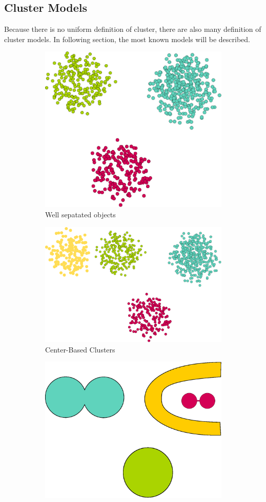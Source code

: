 \subsection{Cluster Models}
Because there is no uniform definition of cluster, there are also many definition of cluster models. In following section, the most known models will be described.

\begin{figure}[h]
\centering
\begin{subfigure}{.49\textwidth}
  \centering
  \includegraphics[width=.5\linewidth]{img/wellSeparatedObjects.eps}
  \caption{Well sepatated objects}
  \label{fig:wellSeparatedObjects}
\end{subfigure}
\begin{subfigure}{.49\textwidth}
  \centering
  \includegraphics[width=.5\linewidth]{img/centerBasedClusters.eps}
  \caption{Center-Based Clusters}
  \label{fig:centerBasedClusters}
\end{subfigure}
\vspace*{0.5cm} 
\begin{subfigure}{.49\textwidth}
  \centering
  \includegraphics[width=.5\linewidth]{img/contiguousClusters.eps}

\end{subfigure}
\end{figure}

